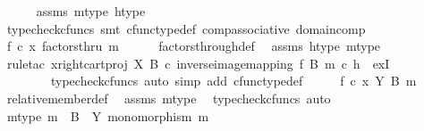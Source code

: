 \begin{isabellebody}
\ \ \ \ \isamarkupfalse%
\ assms\ m{\isacharunderscore}{\kern0pt}type\ h{\isacharunderscore}{\kern0pt}type\ \isamarkupfalse%
\ {\isacharparenleft}{\kern0pt}typecheck{\isacharunderscore}{\kern0pt}cfuncs{\isacharcomma}{\kern0pt}\ smt\ cfunc{\isacharunderscore}{\kern0pt}type{\isacharunderscore}{\kern0pt}def\ comp{\isacharunderscore}{\kern0pt}associative\ domain{\isacharunderscore}{\kern0pt}comp{\isacharparenright}{\kern0pt}\isanewline
\ \ \isamarkupfalse%
\ \isamarkupfalse%
\ {\isachardoublequoteopen}{\isacharparenleft}{\kern0pt}f\ {\isasymcirc}\isactrlsub c\ x{\isacharparenright}{\kern0pt}\ factorsthru\ m{\isachardoublequoteclose}\isanewline
\ \ \ \ \isamarkupfalse%
\ factors{\isacharunderscore}{\kern0pt}through{\isacharunderscore}{\kern0pt}def\ \isamarkupfalse%
\ assms\ h{\isacharunderscore}{\kern0pt}type\ m{\isacharunderscore}{\kern0pt}type\isanewline
\ \ \ \ \isamarkupfalse%
\ {\isacharparenleft}{\kern0pt}rule{\isacharunderscore}{\kern0pt}tac\ x{\isacharequal}{\kern0pt}{\isachardoublequoteopen}right{\isacharunderscore}{\kern0pt}cart{\isacharunderscore}{\kern0pt}proj\ X\ B\ {\isasymcirc}\isactrlsub c\ inverse{\isacharunderscore}{\kern0pt}image{\isacharunderscore}{\kern0pt}mapping\ f\ B\ m\ {\isasymcirc}\isactrlsub c\ h{\isachardoublequoteclose}\ \ exI{\isacharcomma}{\kern0pt}\isanewline
\ \ \ \ \ \ \ \ typecheck{\isacharunderscore}{\kern0pt}cfuncs{\isacharcomma}{\kern0pt}\ auto\ simp\ add{\isacharcolon}{\kern0pt}\ cfunc{\isacharunderscore}{\kern0pt}type{\isacharunderscore}{\kern0pt}def{\isacharparenright}{\kern0pt}\isanewline
\ \ \isamarkupfalse%
\ \isamarkupfalse%
\ {\isachardoublequoteopen}f\ {\isasymcirc}\isactrlsub c\ x\ {\isasymin}\isactrlbsub Y\isactrlesub \ {\isacharparenleft}{\kern0pt}B{\isacharcomma}{\kern0pt}\ m{\isacharparenright}{\kern0pt}{\isachardoublequoteclose}\isanewline
\ \ \ \ \isamarkupfalse%
\ relative{\isacharunderscore}{\kern0pt}member{\isacharunderscore}{\kern0pt}def{}\ \isamarkupfalse%
\ assms\ m{\isacharunderscore}{\kern0pt}type\ \isamarkupfalse%
\ {\isacharparenleft}{\kern0pt}typecheck{\isacharunderscore}{\kern0pt}cfuncs{\isacharcomma}{\kern0pt}\ auto{\isacharparenright}{\kern0pt}\isanewline
{}\isamarkupfalse%
\isanewline
\ \ \isamarkupfalse%
\ m{\isacharunderscore}{\kern0pt}type{\isacharcolon}{\kern0pt}\ {\isachardoublequoteopen}m\ {\isacharcolon}{\kern0pt}\ B\ {\isasymrightarrow}\ Y{\isachardoublequoteclose}\ {\isachardoublequoteopen}monomorphism\ m{\isachardoublequoteclose}\isanewline

\end{isabellebody}
